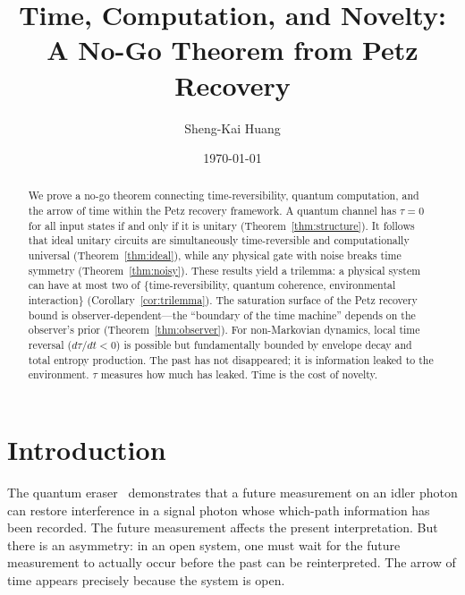 \documentclass[prl,twocolumn,superscriptaddress,longbibliography,floatfix]{revtex4-2}
\newcommand{\tauasym}{\tau}
\begin{document}
\title{Time, Computation, and Novelty: A No-Go Theorem from Petz Recovery}

\author{Sheng-Kai Huang}

\date{\today}

\begin{abstract}
We prove a no-go theorem connecting time-reversibility, quantum
computation, and the arrow of time within the Petz recovery
framework.  A quantum channel has $\tauasym = 0$ for all input states
if and only if it is unitary (Theorem~\ref{thm:structure}).  It follows
that ideal unitary circuits are simultaneously time-reversible and
computationally universal (Theorem~\ref{thm:ideal}), while any
physical gate with noise breaks time symmetry
(Theorem~\ref{thm:noisy}).  These results yield a trilemma: a physical
system can have at most two of \{time-reversibility, quantum
coherence, environmental interaction\} (Corollary~\ref{cor:trilemma}).
The saturation surface of the Petz recovery bound is
observer-dependent---the ``boundary of the time machine'' depends on
the observer's prior (Theorem~\ref{thm:observer}).  For non-Markovian
dynamics, local time reversal ($d\tauasym/dt < 0$) is possible but
fundamentally bounded by envelope decay and total entropy production.
The past has not disappeared; it is information leaked to the
environment.  $\tauasym$ measures how much has leaked.  Time is the
cost of novelty.
\end{abstract}

\maketitle

\section{Introduction}
\label{sec:intro}

The quantum eraser~\cite{Scully1982,Kim2000} demonstrates that a
future measurement on an idler photon can restore interference in a
signal photon whose which-path information has been recorded.  The
future measurement affects the present interpretation.  But there is
an asymmetry: in an open system, one must wait for the future
measurement to actually occur before the past can be reinterpreted.
The arrow of time appears precisely because the system is open.
\end{document}
